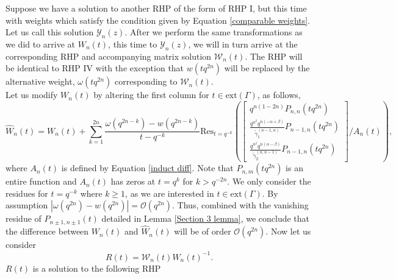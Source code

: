 \documentclass[a4paper,reqno]{amsart}
\numberwithin{equation}{section}
\numberwithin{figure}{section}
\begin{document}
Suppose we have a solution to another RHP of the form of RHP I, but this time with weights which satisfy the condition given by Equation \eqref{comparable weights}. Let us call this solution $\mathcal{Y}_n(z)$.  After we perform the same transformations as we did to arrive at $W_n(t)$, this time to $\mathcal{Y}_n(z)$, we will in turn arrive at the corresponding RHP and accompanying matrix solution $\mathcal{W}_n(t)$. The RHP will be identical to RHP IV with the exception that $w(tq^{2n})$ will be replaced by the alternative weight, $\omega(tq^{2n})$ corresponding to $\mathcal{W}_n(t) $.\\

Let us modify $W_n(t)$ by altering the first column for $t\in \text{ext}(\Gamma)$, as follows,
\begin{equation}
    \widehat{W}_n(t) = W_n(t) + \sum_{k=1}^{2n} \frac{\omega(q^{2n-k})-w(q^{2n-k})}{t-q^{-k}} \text{Res}_{t=q^{-k}} \left( \begin{bmatrix}
q^{n(1-2n)}P_{n,n}(tq^{2n})\\
\frac{q^{n^2}q^{n(-\alpha+\beta)}}{\tilde{\gamma}_1^{(n-1,n)}} P_{n-1,n}(tq^{2n})\\
 \frac{q^{n^2}q^{n(\alpha-\beta)}}{\tilde{\gamma}_2^{(n,n-1)}} P_{n-1,n}(tq^{2n})
\end{bmatrix}/A_n(t)\right),
\end{equation}
where $A_n(t)$ is defined by Equation \eqref{induct diff}. Note that $P_{n,m}(tq^{2n})$ is an entire function and $A_n(t)$ has zeros at $t=q^k$ for $k>q^{-2n}$. We only consider the residues for $t=q^{-k}$ where $k\geq 1$, as we are interested in $t\in \text{ext}(\Gamma)$. By assumption $|\omega(q^{2n})-w(q^{2n})|=\mathcal{O}(q^{2n})$. Thus, combined with the vanishing residue of $P_{n\pm 1,n\pm 1}(t)$ detailed in Lemma \ref{Section 3 lemma}, we conclude that the difference between $W_n(t)$ and $\widehat{W}_n(t)$ will be of order $\mathcal{O}(q^{2n})$. Now let us consider 
\[ R(t) = \mathcal{W}_n(t)\widehat{W}_n(t)^{-1} .\]
$R(t)$ is a solution to the following RHP
\end{document}
